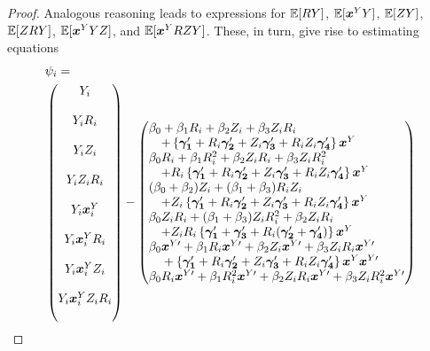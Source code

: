\documentclass[]{article}
\begin{document}
\begin{proof}
Analogous reasoning leads to expressions for $\mathbb{E}[RY]$, $\mathbb{E}[\bm{x}^Y Y]$, $\mathbb{E}[ZY]$,  $\mathbb{E}[ZRY]$, $\mathbb{E}[\bm{x}^Y YZ]$, and $\mathbb{E}[\bm{x}^Y RZY]$.
These, in turn, give rise to estimating equations
\begin{equation*}
\begin{split}
  &\psi_i=\\ &\begin{pmatrix}
  Y_i\\
  \phantom{}\\
  Y_i\ri\\
    \phantom{}\\
  Y_iZ_i\\
  \phantom{}\\
  Y_iZ_i\ri\\
  \phantom{}\\
  Y_i\bxy_i\\
  \phantom{}\\
  Y_i\bxy_i\ri\\
  \phantom{}\\
  Y_i\bxy_iZ_i\\
  \phantom{}\\
  Y_i\bxy_iZ_i\ri\\
  \phantom{}\end{pmatrix} - \begin{pmatrix*}[l]
    \beta_0+\beta_1R_i+\beta_2Z_i+\beta_3Z_iR_i\\
    \quad+\left\{\bm{\gamma_1}'+R_i\bm{\gamma_2}'+Z_i\bm{\gamma_3}'+R_iZ_i\bm{\gamma_4}'\right\}\bxy\\
    \beta_0\ri+\beta_1R_i^2+\beta_2Z_i\ri+\beta_3Z_iR_i^2\\
    \quad+\ri\left\{\bm{\gamma_1}'+R_i\bm{\gamma_2}'+Z_i\bm{\gamma_3}'+R_iZ_i\bm{\gamma_4}'\right\}\bxy\\
    (\beta_0+\beta_2)Z_i+(\beta_1+\beta_3)R_iZ_i\\
    \quad+Z_i\left\{\bm{\gamma_1}'+R_i\bm{\gamma_2}'+Z_i\bm{\gamma_3}'+R_iZ_i\bm{\gamma_4}'\right\}\bxy\\
    \beta_0Z_i\ri+(\beta_1+\beta_3)Z_iR_i^2+\beta_2Z_i\ri\\
    \quad+Z_iR_i\left\{\bm{\gamma_1}'+\bm{\gamma_3}'+R_i(\bm{\gamma_2}'+\bm{\gamma_4}')\right\}\bxy \\
    \beta_0\bxyt+\beta_1R_i\bxyt+\beta_2Z_i\bxyt+\beta_3Z_iR_i\bxyt\\
    \quad {}+\left\{\bm{\gamma_1}'+R_i\bm{\gamma_2}'+Z_i\bm{\gamma_3}'+R_iZ_i\bm{\gamma_4}'\right\}\bxy\bxyt\\
    \beta_0\ri\bxyt+\beta_1R_i^2\bxyt+\beta_2Z_i\ri\bxyt+\beta_3Z_iR_i^2\bxyt\\

\end{pmatrix*}
\end{split}
\end{equation*}
\end{proof}
\end{document}
